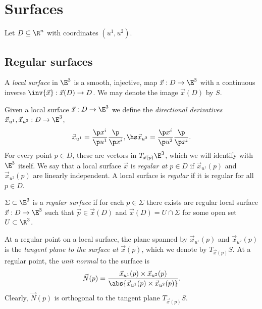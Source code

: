 \documentclass{article}
\begin{document}
\section{Surfaces}

Let $D\subseteq\R^n$ with coordinates $(u^1,u^2)$.

\subsection{Regular surfaces}

\begin{definition}
    A \emph{local surface} in $\E^3$ is a smooth, injective, map $\vec x: D\to\E^3$
    with a continuous inverse $\inv{\vec x} : \vec x(D) \to D$. We may denote the image
    $\vec x (D)$ by $S$.
\end{definition}

\begin{definition}
    Given a local surface $\vec x:D\to\E^3$ we define the \emph{directional derivatives}
    $\vec x_{u^1},\vec x_{u^2}:D\to\E^3$,
    \begin{align*}
        \vec x_{u^1} = \frac{\p x^i}{\p u^1}\frac{\p}{\p x^i}, \hs 
        \vec x_{u^2} = \frac{\p x^i}{\p u^2}\frac{\p}{\p x^i}.
    \end{align*}
    For every point $p\in D$, these are vectors in $T_{\vec x(p)}\E^3$, which we will 
    identify with $\E^3$ itself. We say that a local surface $\vec x$ is \emph{regular
    at $p\in D$} if $\vec x_{u^1}(p)$ and $\vec x_{u^2}(p)$ are linearly independent.
    A local surface is \emph{regular} if it is regular for all $p\in D$.
\end{definition}

\begin{definition}
    $\Sigma\subset\E^3$ is a \emph{regular surface} if for each $p\in\Sigma$ there
    exists are regular local surface $\vec x:D\to\E^3$ such that $\vec p\in\vec x(D)$
    and $\vec x(D)=U\cap\Sigma$ for some open set $U\subset\R^3$.
\end{definition}

\begin{definition}
    At a regular point on a local surface, the plane spanned by $\vec x_{u^1}(p)$ 
    and $\vec x_{u^2}(p)$ is the \emph{tangent plane to the surface at $\vec x(p)$},
    which we denote by $T_{\vec x(p)}S$. At a regular point, the \emph{unit normal}
    to the surface is 
    \begin{align*}
        \vec N(p)=\frac{\vec x_{u^1}(p)\times\vec x_{u^2}(p)}{\abs{\vec x_{u^1}(p)\times\vec x_{u^2}(p)}}.
    \end{align*}
    Clearly, $\vec N(p)$ is orthogonal to the tangent plane $T_{\vec x(p)}S$.
\end{definition}
\end{document}
